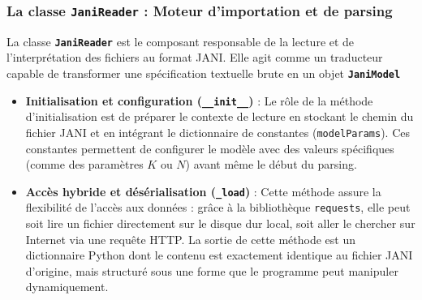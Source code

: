 \documentclass[14pt, a4paper]{extarticle}
\begin{document}
\subsubsection{La classe \texttt{JaniReader} : Moteur d'importation et de parsing}

La classe \textbf{\texttt{JaniReader}} est le composant responsable de la lecture et de l'interprétation des fichiers au format JANI. Elle agit comme un traducteur capable de transformer une spécification textuelle brute en un objet \textbf{\texttt{JaniModel}}

\begin{itemize}
    \item \textbf{Initialisation et configuration (\texttt{\_\_init\_\_})} : Le rôle de la méthode d'initialisation est de préparer le contexte de lecture en stockant le chemin du fichier JANI et en intégrant le dictionnaire de constantes (\texttt{modelParams}). Ces constantes permettent de configurer le modèle avec des valeurs spécifiques (comme des paramètres $K$ ou $N$) avant même le début du parsing.
    
    \item \textbf{Accès hybride et désérialisation (\texttt{\_load})} : Cette méthode assure la flexibilité de l'accès aux données : grâce à la bibliothèque \texttt{requests}, elle peut soit lire un fichier directement sur le disque dur local, soit aller le chercher sur Internet via une requête HTTP. La sortie de cette méthode est un dictionnaire Python dont le contenu est exactement identique au fichier JANI d'origine, mais structuré sous une forme que le programme peut manipuler dynamiquement.


\end{itemize}
\end{document}
